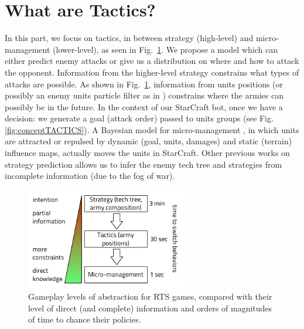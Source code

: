 \section{What are Tactics?}
In this part, we focus on tactics, in between strategy (high-level) and micro-management (lower-level), as seen in Fig.~\ref{fig:sc_abstraction_tactics}. We propose a model which can either predict enemy attacks or give us a distribution on where and how to attack the opponent. Information from the higher-level strategy constrains what types of attacks are possible. As shown in Fig.~\ref{fig:sc_abstraction_tactics}, information from units positions (or possibly an enemy units particle filter as in \cite{Weber2011aiide}) constrains where the armies can possibly be in the future. In the context of our StarCraft bot, once we have a decision: we generate a goal (attack order) passed to units groups (see Fig.\ref{fig:conceptTACTICS}). A Bayesian model for micro-management \cite{SYNNAEVE:Micro}, in which units are attracted or repulsed by dynamic (goal, units, damages) and static (terrain) influence maps, actually moves the units in StarCraft. Other previous works on strategy prediction \cite{SYNNAEVE:StratPred,SYNNAEVE:OpeningPred} allows us to infer the enemy tech tree and strategies from incomplete information (due to the fog of war).

\begin{figure}[htp]
\centerline{\includegraphics[width=7cm]{images/starcraft_levels_abstraction_light.pdf}}
\caption{Gameplay levels of abstraction for RTS games, compared with their level of direct (and complete) information and orders of magnitudes of time to chance their policies.}
\label{fig:sc_abstraction_tactics}
\end{figure}

